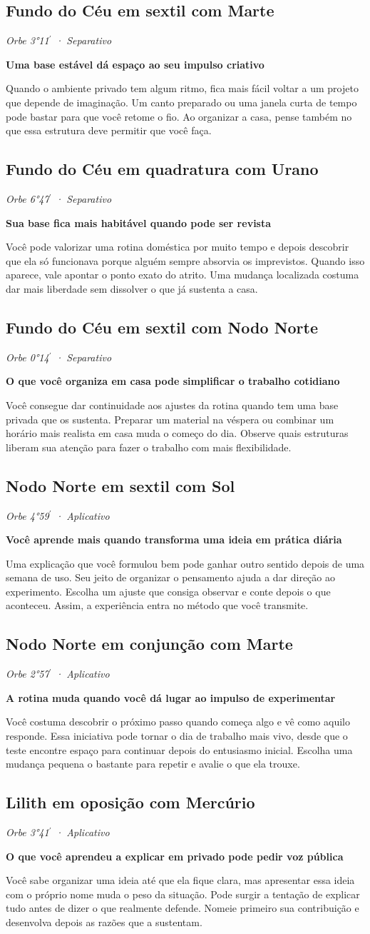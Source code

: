 \documentclass[11pt,a4paper]{article}
\newcommand{\leitura}[3]{\subsection{#1}\textit{#2}\par #3}
\newcommand{\subtituloleitura}[1]{\textbf{#1}\par\nopagebreak[4]}
\begin{document}
\leitura{Fundo do Céu em sextil com Marte}{Orbe 3°11\ensuremath{^{\prime}} · Separativo}{
\subtituloleitura{Uma base estável dá espaço ao seu impulso criativo}
Quando o ambiente privado tem algum ritmo, fica mais fácil voltar a um projeto que depende de imaginação. Um canto preparado ou uma janela curta de tempo pode bastar para que você retome o fio. Ao organizar a casa, pense também no que essa estrutura deve permitir que você faça.
}

\leitura{Fundo do Céu em quadratura com Urano}{Orbe 6°47\ensuremath{^{\prime}} · Separativo}{
\subtituloleitura{Sua base fica mais habitável quando pode ser revista}
Você pode valorizar uma rotina doméstica por muito tempo e depois descobrir que ela só funcionava porque alguém sempre absorvia os imprevistos. Quando isso aparece, vale apontar o ponto exato do atrito. Uma mudança localizada costuma dar mais liberdade sem dissolver o que já sustenta a casa.
}

\leitura{Fundo do Céu em sextil com Nodo Norte}{Orbe 0°14\ensuremath{^{\prime}} · Separativo}{
\subtituloleitura{O que você organiza em casa pode simplificar o trabalho cotidiano}
Você consegue dar continuidade aos ajustes da rotina quando tem uma base privada que os sustenta. Preparar um material na véspera ou combinar um horário mais realista em casa muda o começo do dia. Observe quais estruturas liberam sua atenção para fazer o trabalho com mais flexibilidade.
}

\leitura{Nodo Norte em sextil com Sol}{Orbe 4°59\ensuremath{^{\prime}} · Aplicativo}{
\subtituloleitura{Você aprende mais quando transforma uma ideia em prática diária}
Uma explicação que você formulou bem pode ganhar outro sentido depois de uma semana de uso. Seu jeito de organizar o pensamento ajuda a dar direção ao experimento. Escolha um ajuste que consiga observar e conte depois o que aconteceu. Assim, a experiência entra no método que você transmite.
}

\leitura{Nodo Norte em conjunção com Marte}{Orbe 2°57\ensuremath{^{\prime}} · Aplicativo}{
\subtituloleitura{A rotina muda quando você dá lugar ao impulso de experimentar}
Você costuma descobrir o próximo passo quando começa algo e vê como aquilo responde. Essa iniciativa pode tornar o dia de trabalho mais vivo, desde que o teste encontre espaço para continuar depois do entusiasmo inicial. Escolha uma mudança pequena o bastante para repetir e avalie o que ela trouxe.
}

\leitura{Lilith em oposição com Mercúrio}{Orbe 3°41\ensuremath{^{\prime}} · Aplicativo}{
\subtituloleitura{O que você aprendeu a explicar em privado pode pedir voz pública}
Você sabe organizar uma ideia até que ela fique clara, mas apresentar essa ideia com o próprio nome muda o peso da situação. Pode surgir a tentação de explicar tudo antes de dizer o que realmente defende. Nomeie primeiro sua contribuição e desenvolva depois as razões que a sustentam.
}
\end{document}
